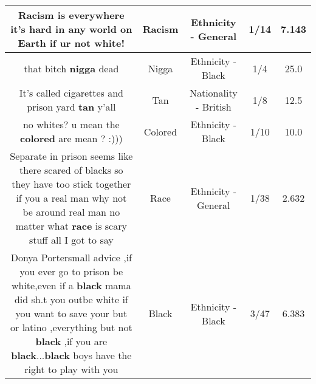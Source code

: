 \documentclass[11pt]{article}
\newlength\mylength
\begin{document}
\begin{center}
\begin{longtable}{|C{.65\mylength}|C{.30\mylength}|C{.12\mylength}|C{.12\mylength}|C{.12\mylength}|}
  \small Racism is everywhere it's hard in any world on Earth if ur not white!\normalsize   & Racism & Ethnicity - General & 1/14 & 7.143 \\  \hline
  \small that bitch \textbf{nigga} dead\normalsize   & Nigga & Ethnicity - Black & 1/4 & 25.0 \\  \hline
  \small It's called cigarettes and prison yard \textbf{tan} y'all\normalsize   & Tan & Nationality - British & 1/8 & 12.5 \\  \hline
  \small no whites? u mean the \textbf{colored} are mean ? :)))\normalsize   & Colored & Ethnicity - Black & 1/10 & 10.0 \\  \hline
  \small Separate in prison seems like there scared of blacks so they have too stick together if you a real man why not be around real man no matter what \textbf{race} is scary stuff all I got to say\normalsize   & Race & Ethnicity - General & 1/38 & 2.632 \\  \hline
  \small Donya Portersmall advice ,if you ever go to prison be white,even if a \textbf{black} mama did sh.t you outbe white if you want to save your but or latino ,everything but not \textbf{black} ,if you are \textbf{black}...\textbf{black} boys have the right to play with you\normalsize   & Black & Ethnicity - Black & 3/47 & 6.383 \\  \hline

\end{longtable}
\end{center}
\end{document}
